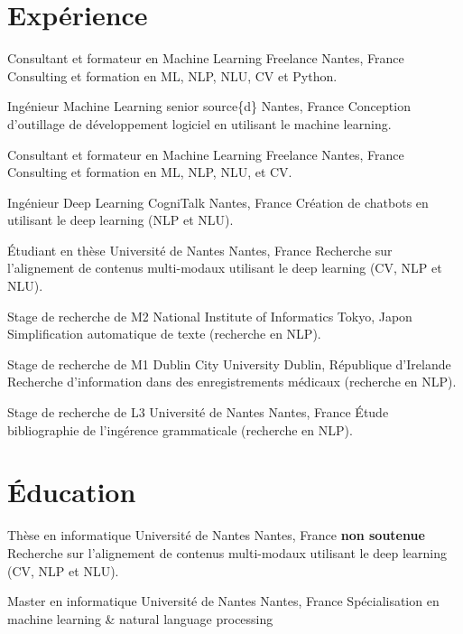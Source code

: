 \documentclass[11pt,a4paper]{moderncv}
\begin{document}
\makecvtitle

\section{Expérience}

%
{Consultant et formateur en Machine Learning}%
{Freelance}%
{Nantes, France}%
{}%
{Consulting et formation en ML, NLP, NLU, CV et Python.}

%
{Ingénieur Machine Learning senior}%
{source\{d\}}%
{Nantes, France}%
{}%
{Conception d'outillage de développement logiciel en utilisant le machine learning.}

%
{Consultant et formateur en Machine Learning}%
{Freelance}%
{Nantes, France}%
{}%
{Consulting et formation en ML, NLP, NLU, et CV.}

%
{Ingénieur Deep Learning}%
{CogniTalk}%
{Nantes, France}%
{}%
{Création de chatbots en utilisant le deep learning (NLP et NLU).}

%
{Étudiant en thèse}%
{Université de Nantes}%
{Nantes, France}%
{}%
{Recherche sur l'alignement de contenus multi-modaux utilisant le deep learning (CV, NLP et NLU).}

%
{Stage de recherche de M2}%
{National Institute of Informatics}%
{Tokyo, Japon}%
{}%
{Simplification automatique de texte (recherche en NLP).}

%
{Stage de recherche de M1}%
{Dublin City University}%
{Dublin, République d'Irelande}%
{}%
{Recherche d'information dans des enregistrements médicaux (recherche en NLP).}

%
{Stage de recherche de L3}%
{Université de Nantes}%
{Nantes, France}%
{}%
{Étude bibliographie de l'ingérence grammaticale (recherche en NLP).}

\section{Éducation}

%
{Thèse en informatique}%
{Université de Nantes}%
{Nantes, France}%
{\textbf{non soutenue}}%
{Recherche sur l'alignement de contenus multi-modaux utilisant le deep learning (CV, NLP et NLU).}

%
{Master en informatique}%
{Université de Nantes}%
{Nantes, France}%
{}%
{Spécialisation en machine learning \& natural language processing}
\end{document}
